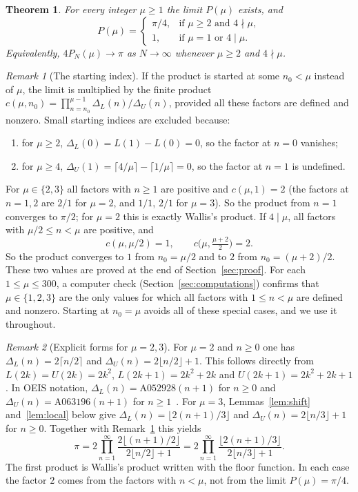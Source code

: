\documentclass{amsart}
\newtheorem{theorem}{Theorem}
\theoremstyle{definition}
\theoremstyle{remark}
\newtheorem{remark}{Remark}
\newcommand{\DL}{\Delta_L}
\newcommand{\DU}{\Delta_U}
\begin{document}
\begin{theorem}\label{thm:main}
For every integer $\mu\ge1$ the limit $P(\mu)$ exists, and
\[
P(\mu)=\begin{cases}
\pi/4, & \text{if } \mu\ge2 \text{ and } 4\nmid\mu,\\
1, & \text{if } \mu=1 \text{ or } 4\mid\mu.
\end{cases}
\]
Equivalently, $4P_N(\mu)\to\pi$ as $N\to\infty$ whenever $\mu\ge2$ and $4\nmid\mu$.
\end{theorem}

\begin{remark}[The starting index]\label{rem:start}
If the product is started at some $n_0<\mu$ instead of $\mu$, the limit is multiplied by the finite product $c(\mu,n_0)=\prod_{n=n_0}^{\mu-1}\DL(n)/\DU(n)$, provided all these factors are defined and nonzero. Small starting indices are excluded because:
\begin{enumerate}
\item for $\mu\ge2$, $\DL(0)=L(1)-L(0)=0$, so the factor at $n=0$ vanishes;
\item for $\mu\ge4$, $\DU(1)=\lceil 4/\mu\rceil-\lceil1/\mu\rceil=0$, so the factor at $n=1$ is undefined.
\end{enumerate}
For $\mu\in\{2,3\}$ all factors with $n\ge1$ are positive and $c(\mu,1)=2$ (the factors at $n=1,2$ are $2/1$ for $\mu=2$, and $1/1$, $2/1$ for $\mu=3$). So the product from $n=1$ converges to $\pi/2$; for $\mu=2$ this is exactly Wallis's product. If $4\mid\mu$, all factors with $\mu/2\le n<\mu$ are positive, and
\[
c(\mu,\mu/2)=1,\qquad c\bigl(\mu,\tfrac{\mu+2}{2}\bigr)=2 .
\]
So the product converges to $1$ from $n_0=\mu/2$ and to $2$ from $n_0=(\mu+2)/2$. These two values are proved at the end of Section~\ref{sec:proof}. For each $1\le\mu\le300$, a computer check (Section~\ref{sec:computations}) confirms that $\mu\in\{1,2,3\}$ are the only values for which all factors with $1\le n<\mu$ are defined and nonzero. Starting at $n_0=\mu$ avoids all of these special cases, and we use it throughout.
\end{remark}

\begin{remark}[Explicit forms for $\mu=2,3$]\label{rem:small}
For $\mu=2$ and $n\ge0$ one has $\DL(n)=2\lceil n/2\rceil$ and $\DU(n)=2\lfloor n/2\rfloor+1$. This follows directly from $L(2k)=U(2k)=2k^2$, $L(2k+1)=2k^2+2k$ and $U(2k+1)=2k^2+2k+1$. In OEIS notation, $\DL(n)=\mathrm{A052928}(n+1)$ for $n\ge0$ and $\DU(n)=\mathrm{A063196}(n+1)$ for $n\ge1$~\cite{oeisA052928,oeisA063196}. For $\mu=3$, Lemmas~\ref{lem:shift} and~\ref{lem:local} below give $\DL(n)=\lfloor 2(n+1)/3\rfloor$ and $\DU(n)=2\lfloor n/3\rfloor+1$ for $n\ge0$. Together with Remark~\ref{rem:start} this yields
\[
\pi=2\prod_{n=1}^{\infty}\frac{2\lfloor (n+1)/2\rfloor}{2\lfloor n/2\rfloor+1}
=2\prod_{n=1}^{\infty}\frac{\lfloor 2(n+1)/3\rfloor}{2\lfloor n/3\rfloor+1}.
\]
The first product is Wallis's product written with the floor function. In each case the factor $2$ comes from the factors with $n<\mu$, not from the limit $P(\mu)=\pi/4$.
\end{remark}
\end{document}
